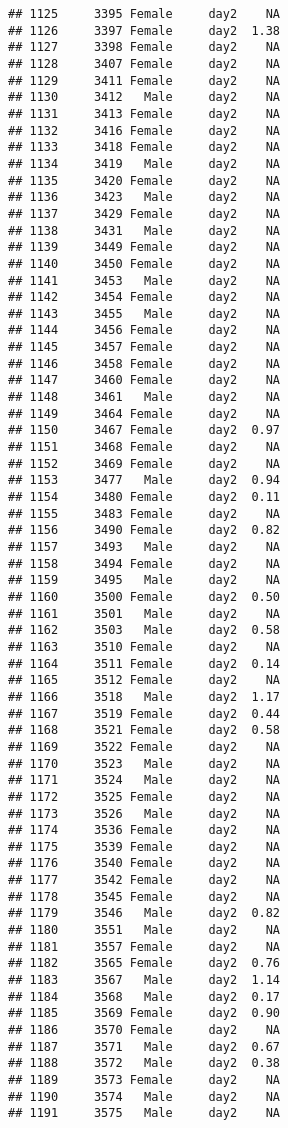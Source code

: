 \documentclass[
]{article}
\begin{document}
\begin{verbatim}
## 1125     3395 Female     day2    NA
## 1126     3397 Female     day2  1.38
## 1127     3398 Female     day2    NA
## 1128     3407 Female     day2    NA
## 1129     3411 Female     day2    NA
## 1130     3412   Male     day2    NA
## 1131     3413 Female     day2    NA
## 1132     3416 Female     day2    NA
## 1133     3418 Female     day2    NA
## 1134     3419   Male     day2    NA
## 1135     3420 Female     day2    NA
## 1136     3423   Male     day2    NA
## 1137     3429 Female     day2    NA
## 1138     3431   Male     day2    NA
## 1139     3449 Female     day2    NA
## 1140     3450 Female     day2    NA
## 1141     3453   Male     day2    NA
## 1142     3454 Female     day2    NA
## 1143     3455   Male     day2    NA
## 1144     3456 Female     day2    NA
## 1145     3457 Female     day2    NA
## 1146     3458 Female     day2    NA
## 1147     3460 Female     day2    NA
## 1148     3461   Male     day2    NA
## 1149     3464 Female     day2    NA
## 1150     3467 Female     day2  0.97
## 1151     3468 Female     day2    NA
## 1152     3469 Female     day2    NA
## 1153     3477   Male     day2  0.94
## 1154     3480 Female     day2  0.11
## 1155     3483 Female     day2    NA
## 1156     3490 Female     day2  0.82
## 1157     3493   Male     day2    NA
## 1158     3494 Female     day2    NA
## 1159     3495   Male     day2    NA
## 1160     3500 Female     day2  0.50
## 1161     3501   Male     day2    NA
## 1162     3503   Male     day2  0.58
## 1163     3510 Female     day2    NA
## 1164     3511 Female     day2  0.14
## 1165     3512 Female     day2    NA
## 1166     3518   Male     day2  1.17
## 1167     3519 Female     day2  0.44
## 1168     3521 Female     day2  0.58
## 1169     3522 Female     day2    NA
## 1170     3523   Male     day2    NA
## 1171     3524   Male     day2    NA
## 1172     3525 Female     day2    NA
## 1173     3526   Male     day2    NA
## 1174     3536 Female     day2    NA
## 1175     3539 Female     day2    NA
## 1176     3540 Female     day2    NA
## 1177     3542 Female     day2    NA
## 1178     3545 Female     day2    NA
## 1179     3546   Male     day2  0.82
## 1180     3551   Male     day2    NA
## 1181     3557 Female     day2    NA
## 1182     3565 Female     day2  0.76
## 1183     3567   Male     day2  1.14
## 1184     3568   Male     day2  0.17
## 1185     3569 Female     day2  0.90
## 1186     3570 Female     day2    NA
## 1187     3571   Male     day2  0.67
## 1188     3572   Male     day2  0.38
## 1189     3573 Female     day2    NA
## 1190     3574   Male     day2    NA
## 1191     3575   Male     day2    NA

\end{verbatim}
\end{document}
